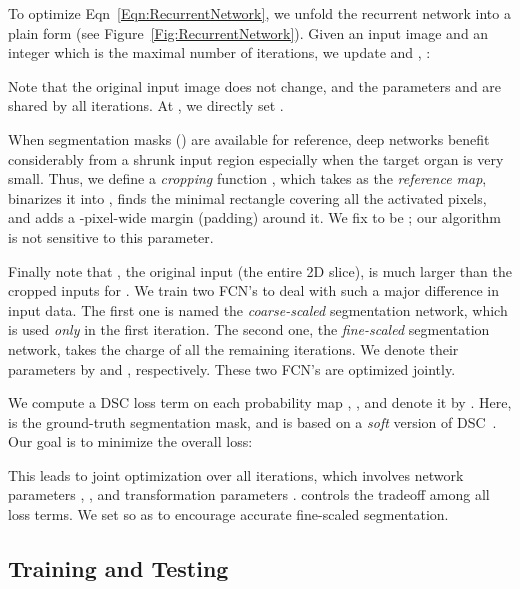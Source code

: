 \documentclass[10pt,twocolumn,letterpaper]{article}
\begin{document}
To optimize Eqn~\eqref{Eqn:RecurrentNetwork},
we unfold the recurrent network into a plain form (see Figure~\ref{Fig:RecurrentNetwork}).
Given an input image  and an integer  which is the maximal number of iterations,
we update  and , :

Note that the original input image  does not change,
and the parameters  and  are shared by all iterations.
At , we directly set .

When segmentation masks  () are available for reference,
deep networks benefit considerably from a shrunk input region especially when the target organ is very small.
Thus, we define a {\em cropping} function ,
which takes  as the {\em reference map},
binarizes it into ,
finds the minimal rectangle covering all the activated pixels, and adds a -pixel-wide margin (padding) around it.
We fix  to be ; our algorithm is not sensitive to this parameter.

Finally note that , the original input (the entire 2D slice),
is much larger than the cropped inputs  for .
We train two FCN's to deal with such a major difference in input data.
The first one is named the {\em coarse-scaled} segmentation network, which is used {\em only} in the first iteration.
The second one, the {\em fine-scaled} segmentation network, takes the charge of all the remaining iterations.
We denote their parameters by  and , respectively.
These two FCN's are optimized jointly.

We compute a DSC loss term on each probability map , ,
and denote it by .
Here,  is the ground-truth segmentation mask,
and 
is based on a {\em soft} version of DSC~\cite{Milletari_2016_VNet}.
Our goal is to minimize the overall loss:

This leads to joint optimization over all iterations, which involves network parameters ,
, and transformation parameters .
 controls the tradeoff among all loss terms.
We set  so as to encourage accurate fine-scaled segmentation.


\subsection{Training and Testing}
\label{Approach:TrainingAndTesting}
\end{document}
